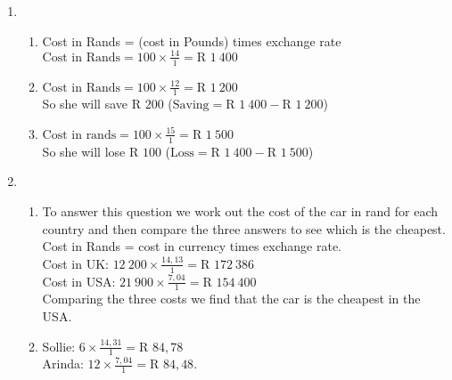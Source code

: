  \begin{solutions}{}{
\begin{enumerate}[itemsep=5pt, label=\textbf{\arabic*}. ] 


\item \begin{enumerate}[noitemsep, label=\textbf{(\alph*)} ]
\item Cost in Rands = (cost in Pounds) times exchange rate\\
$\mbox{Cost in Rands}=100 \times \frac{14}{1} = \mbox{R }1~400$
\item $\mbox{Cost in Rands}=100 \times \frac{12}{1} = \mbox{R }1~200$\\
So she will save $\mbox{R }200$ ($\mbox{Saving} = \mbox{R }1~400 - \mbox{R }1~200$)
\item $\mbox{Cost in rands}=100 \times \frac{15}{1} = \mbox{R }1~500$ \\
So she will lose $\mbox{R }100$ ($\mbox{Loss} = \mbox{R }1~400 - \mbox{R }1~500$)
\end{enumerate}
\item \begin{enumerate}[noitemsep, label=\textbf{(\alph*)} ]
\item To answer this question we work out the cost of the car in rand for each country and then compare the three answers to see which is the cheapest. Cost in Rands = cost in currency times exchange rate.\\
Cost in UK: $12~200 \times \frac{14,13}{1} = \mbox{R }172~386$\\
Cost in USA: $21~900 \times \frac{7,04}{1} = \mbox{R }154~400$\\
Comparing the three costs we find that the car is the cheapest in the USA.
\item Sollie: $6 \times \frac{14,31}{1} = \mbox{R }84,78$\\
Arinda: $12 \times \frac{7,04}{1} = \mbox{R }84,48$.
\end{enumerate}

\end{enumerate}}
\end{solutions}


